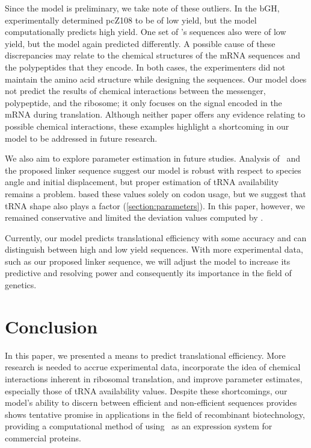 \documentclass[12pt]{article}
\begin{document}
Since the model is preliminary, we take note of these outliers.
In the bGH, \citeauthor{schoner:bgh} experimentally determined
pcZ108 to be of low yield, but the model
computationally predicts high yield.  One set of \citeauthor{weiss87}'s
sequences also were of low yield, but the model again predicted differently.  A possible cause
of these discrepancies may relate to the chemical structures of the mRNA sequences
and the polypeptides that they encode.  In both cases, the experimenters did not
maintain the amino acid structure while designing the sequences.  Our
model does not predict the results of chemical interactions between the messenger, polypeptide, and
the ribosome; it only focuses on the signal encoded in the mRNA during translation.
Although neither paper offers any evidence relating to possible chemical interactions, 
these examples highlight a shortcoming in our model to be addressed in
future research.

We also aim to explore parameter estimation in future studies.  Analysis of \prfB\ and the
proposed linker sequence suggest our model is robust with respect to species angle
and initial displacement, but proper estimation of tRNA availability
remains a problem. \citet{lalit:mechanics} based these values solely on 
codon usage, but we suggest that tRNA shape also plays a factor (\autoref{section:parameters}).
In this paper, however, we remained conservative and limited the
deviation values computed by \citeauthor{lalit:mechanics}.

Currently, our model predicts translational efficiency with some
accuracy and can distinguish between high and low yield sequences. With more experimental data,
such as our proposed linker sequence, we will adjust the model to increase
its predictive and resolving power and consequently its importance in
the field of genetics.

\section{Conclusion}
\label{section:conclusion}

In this paper, we presented a means to predict translational
efficiency.  More research is needed to accrue experimental data, incorporate
the idea of chemical interactions inherent in ribosomal translation, and
improve parameter estimates, especially those of tRNA availability
values. Despite these
shortcomings, our model's ability to discern between efficient and
non-efficient sequences provides shows tentative promise in applications
in the field of recombinant biotechnology, providing
a computational method of using \ecoli\ as an expression system
for commercial proteins.

{}
\begin{singlespace}  \end{singlespace}
\end{document}
